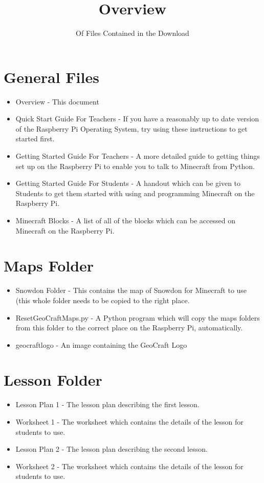 \documentclass{geocraft-worksheet}
\begin{document}
\title{Overview}
\subtitle{Of Files Contained in the Download}

\date{}

\maketitle

\section*{General Files}
\begin{itemize}
\item Overview - This document
\item Quick Start Guide For Teachers - If you have a reasonably up to
  date version of the Raspberry Pi Operating System, try using these
  instructions to get started first.
\item Getting Started Guide For Teachers - A more detailed guide to
  getting things set up on the Raspberry Pi to enable you to talk to
  Minecraft from Python.
\item Getting Started Guide For Students - A handout which can be
  given to Students to get them started with using and programming
  Minecraft on the Raspberry Pi.
\item Minecraft Blocks - A list of all of the blocks which can be
  accessed on Minecraft on the Raspberry Pi.
\end{itemize}

\section*{Maps Folder}
\begin{itemize}
\item Snowdon Folder - This contains the map of Snowdon for Minecraft
  to use (this whole folder needs to be copied to the right place. 
\item ResetGeoCraftMaps.py - A Python program which will copy the maps
  folders from this folder to the correct place on the Raspberry Pi,
  automatically. 
\item geocraftlogo - An image containing the GeoCraft Logo
\end{itemize}

\section*{Lesson Folder}
\begin{itemize}
\item Lesson Plan 1 - The lesson plan describing the first lesson.
\item Worksheet 1 - The worksheet which contains the details of the
  lesson for students to use.
\item Lesson Plan 2 - The lesson plan describing the second lesson.
\item Worksheet 2 - The worksheet which contains the details of the
  lesson for students to use.
\end{itemize}
\end{document}
